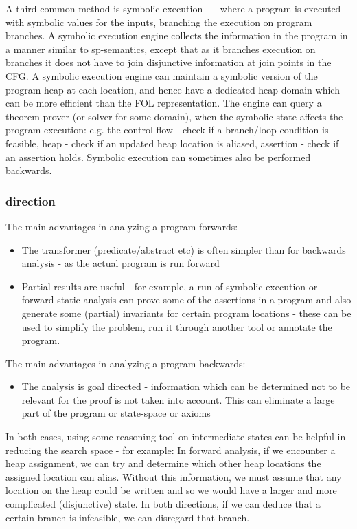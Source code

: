A third common method is symbolic execution ~\cite{Boyer:1975:SFS:390016.808445} - where a program is executed with symbolic values for the inputs, branching the execution on program branches.
A symbolic execution engine collects the information in the program in a manner similar to sp-semantics, except that as it branches execution on branches it does not have to join disjunctive information at join points in the CFG.
A symbolic execution engine can maintain a symbolic version of the program heap at each location, and hence have a dedicated heap domain which can be more efficient than the FOL representation.
The engine can query a theorem prover (or solver for some domain), when the symbolic state affects the program execution: e.g. the  control flow - check if a branch/loop condition is feasible, heap - check if an updated heap location is aliased, assertion - check if an assertion holds.
Symbolic execution can sometimes also be performed backwards.


\subsubsection{direction}
The main advantages in analyzing a program forwards:
\begin{itemize}
	\item The transformer (predicate/abstract etc) is often simpler than for backwards analysis - as the actual program is run forward
	\item Partial results are useful - for example, a run of symbolic execution or forward static analysis can prove some of the assertions in a program and also generate some (partial) invariants for certain program locations - these can be used to simplify the problem, run it through another tool or annotate the program.
\end{itemize}

The main advantages in analyzing a program backwards:
\begin{itemize}
	\item The analysis is goal directed - information which can be determined not to be relevant for the proof is not taken into account.
	This can eliminate a large part of the program or state-space or axioms
\end{itemize}


In both cases, using some reasoning tool on intermediate states can be helpful in reducing the search space - for example:
In forward analysis, if we encounter a heap assignment, we can try and determine which other heap locations the assigned location can alias. Without this information, we must assume that any location on the heap could be written and so we would have a larger and more complicated (disjunctive) state.
In both directions, if we can deduce that a certain branch is infeasible, we can disregard that branch.


